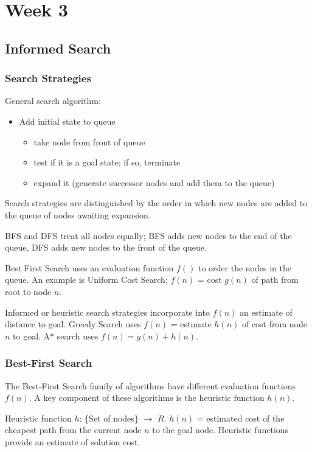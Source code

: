 \part{Week 3}
\chapter{Informed Search}
\section{Search Strategies}
General search algorithm:
\begin{itemize}
    \item Add initial state to queue
    \begin{itemize}
        \item take node from front of queue
        \item test if it is a goal state; if so, terminate
        \item expand it (generate successor nodes and add them to the queue)
    \end{itemize}
\end{itemize}

Search strategies are distinguished by the order in which new nodes are added
to the queue of nodes awaiting expansion.

BFS and DFS treat all nodes equally; BFS adds new nodes to the end of the
queue, DFS adds new nodes to the front of the queue.

Best First Search uses an evaluation function $f()$ to order the nodes in the
queue. An example is Uniform Cost Search; $f(n)$ = cost $g(n)$ of path from
root to node $n$.

Informed or heuristic search strategies incorporate into $f(n)$ an estimate of
distance to goal. Greedy Search uses $f(n)$ = estimate $h(n)$ of cost from node
$n$ to goal. A* search uses $f(n) = g(n) + h(n)$.

\section{Best-First Search}
The Best-First Search family of algorithms have different evaluation functions
$f(n)$. A key component of these algorithms is the heuristic function $h(n)$.

Heuristic function $h$: \{Set of nodes\} $\rightarrow$ $R$. $h(n)$ = estimated
cost of the cheapest path from the current node $n$ to the goal node. Heuristic
functions provide an estimate of solution cost.

